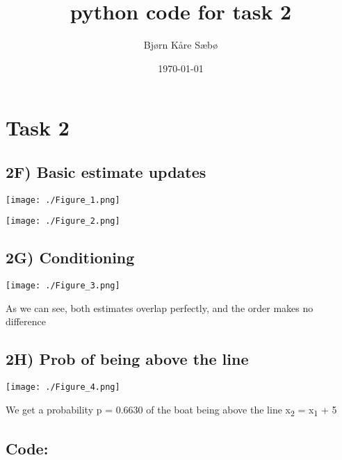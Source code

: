 \documentclass[11pt]{article}
\author{Bjørn Kåre Sæbø}
\date{\today}
\title{python code for task 2}
\begin{document}
\maketitle
\tableofcontents

\section{Task 2}
\label{sec:org93ae977}
\subsection{2F) Basic estimate updates}
\label{sec:org4e86402}
\begin{center}
\texttt{[image: ./Figure\_1.png]}
\end{center}
\begin{center}
\texttt{[image: ./Figure\_2.png]}
\end{center}
\subsection{2G) Conditioning}
\label{sec:orgaf51330}
\begin{center}
\texttt{[image: ./Figure\_3.png]}
\end{center}
As we can see, both estimates overlap perfectly, and the order makes no difference
\subsection{2H) Prob of being above the line}
\label{sec:orge3de344}
\begin{center}
\texttt{[image: ./Figure\_4.png]}
\end{center}
We get a probability p = 0.6630 of the boat being above the line x\textsubscript{2} = x\textsubscript{1} + 5
\subsection{Code:}
\label{sec:org42a0c1b}
\end{document}
